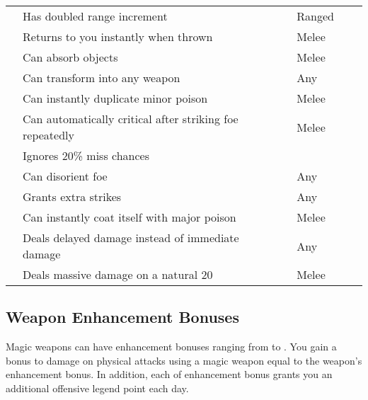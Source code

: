 \begin{longtabuwrapper}
\begin{longtabu}{l X l l l l}
                 & Has doubled range increment &  & Ranged &  \\
                 & Returns to you instantly when thrown &  & Melee &  \\
                 & Can absorb objects &  & Melee &  \\
                 & Can transform into any weapon &  & Any &  \\
                 & Can instantly duplicate minor poison &  & Melee &  \\
                 & Can automatically critical after striking foe repeatedly &  & Melee &  \\
                 & Ignores 20\% miss chances &  &  \\
                 & Can disorient foe &  & Any &  \\
                 & Grants extra strikes &  & Any &  \\
                 & Can instantly coat itself with major poison &  & Melee &  \\
                 & Deals delayed damage instead of immediate damage &  & Any &  \\
                 & Deals massive damage on a natural 20 &  & Melee &  \\
            \end{longtabu}
        \end{longtabuwrapper}
        \twocolumn

    \subsection{Weapon Enhancement Bonuses}\label{Weapon Enhancement Bonuses}

        Magic weapons can have enhancement bonuses ranging from  to .
        You gain a bonus to damage on physical attacks using a magic weapon equal to the weapon's enhancement bonus.
        In addition, each  of enhancement bonus grants you an additional offensive legend point each day.

